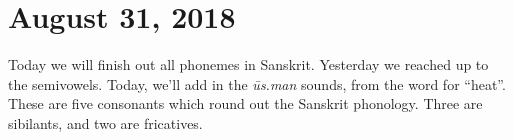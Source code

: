 \section{August 31, 2018}

Today we will finish out all phonemes in Sanskrit.
Yesterday we reached up to the semivowels.
Today, we'll add in the \emph{ūs.man} sounds, from the word for ``heat''.
These are five consonants which round out the Sanskrit phonology.
Three are sibilants, and two are fricatives.